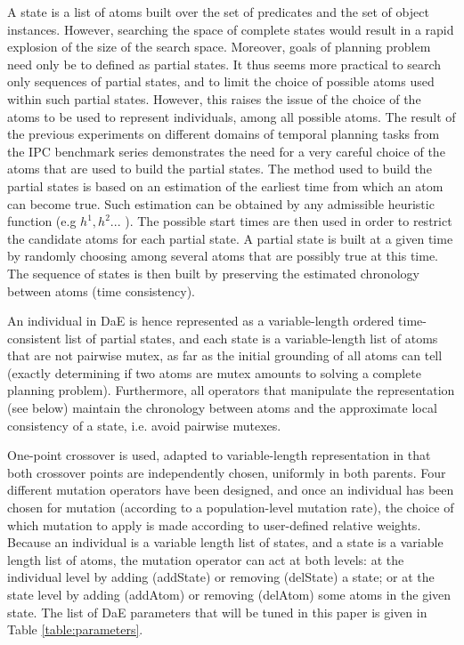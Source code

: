 \documentclass[letterpaper]{article}
\begin{document}
A state is a list of atoms built over the set of predicates and the set of object instances. However, searching the space of complete states would result in a rapid explosion of the size of the search space. Moreover, goals of planning problem need only be to defined as partial states. It thus seems more practical to search only sequences of partial states, and to limit the choice of possible atoms used within such partial states. However, this raises the issue of the choice of the atoms to be used to represent individuals, among all possible atoms. The result of the previous experiments on different domains of temporal planning tasks from the IPC benchmark series \cite{BibEvoCop2009} demonstrates the need for a very careful choice of the atoms that are used to build the partial states. The method used to build the partial states is based on an estimation of the earliest time from which an atom can become true. Such estimation can be obtained by any admissible heuristic function (e.g $h^1,h^2...$ \cite{HaslumGeffner-AIPS-2000}). The possible start times are then used in order to restrict the candidate atoms for each partial state. A partial state is built at a given time by randomly choosing among several atoms that are possibly true at this time. The sequence of states is then built by preserving the estimated chronology between atoms (time consistency).

An individual in DaE is hence represented as a variable-length ordered time-consistent list of partial states, and each state is a variable-length list of atoms that are not pairwise mutex, as far as the initial grounding of all atoms  can tell (exactly determining if two atoms are mutex amounts to solving a complete planning problem). Furthermore, all operators that manipulate the representation (see below) maintain the chronology between atoms and the approximate local consistency of a state, i.e. avoid pairwise mutexes.

One-point crossover is used, adapted to variable-length representation in that both crossover points are independently chosen, uniformly in both parents.
Four different mutation operators have been designed, and once an individual has been chosen for mutation (according to a population-level mutation rate), the choice of which mutation to apply is made according to user-defined relative weights. 
Because an individual is a variable length list of states, and a state is a variable length list of atoms, the mutation 
operator can act at both levels: at the individual level by adding (addState) or removing (delState) 
a state; or at the state level by adding (addAtom) or removing (delAtom) some atoms in the given state. 
The list of DaE parameters that will be tuned in this paper is given in Table \ref{table:parameters}.
\end{document}
